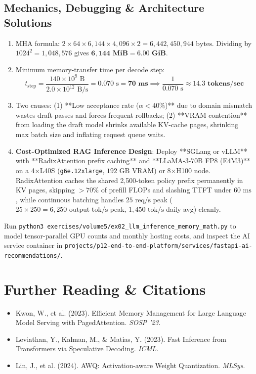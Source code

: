 \subsection*{Mechanics, Debugging \& Architecture Solutions}
\begin{enumerate}[label=\textbf{Solution~\thechapter.\arabic*}, leftmargin=*]
  \item MHA formula: $2 \times 64 \times 6,144 \times 4,096 \times 2 = 6,442,450,944\text{ bytes}$. Dividing by $1024^2 = 1,048,576$ gives $\mathbf{6,144\text{ MiB}} = \mathbf{6.00\text{ GiB}}$.
  \item Minimum memory-transfer time per decode step:
  $$t_{\text{step}} = \frac{140 \times 10^9\text{ B}}{2.0 \times 10^{12}\text{ B/s}} = 0.070\text{ s} = \mathbf{70\text{ ms}} \implies \frac{1}{0.070\text{ s}} \approx \mathbf{14.3\text{ tokens/sec}}$$
  \item Two causes: (1) **Low acceptance rate ($\alpha < 40\%$)** due to domain mismatch wastes draft passes and forces frequent rollbacks; (2) **VRAM contention** from loading the draft model shrinks available KV-cache pages, shrinking max batch size and inflating request queue waits.
  \item \textbf{Cost-Optimized RAG Inference Design}: Deploy **SGLang or vLLM** with **RadixAttention prefix caching** and **LLaMA-3-70B FP8 (E4M3)** on a 4$\times$L40S (\texttt{g6e.12xlarge}, $192\text{ GB}$ VRAM) or 8$\times$H100 node. RadixAttention caches the shared 2,500-token policy prefix permanently in KV pages, skipping $>70\%$ of prefill FLOPs and slashing TTFT under $60\text{ ms}$, while continuous batching handles $25\text{ req/s}$ peak ($25 \times 250 = 6,250\text{ output tok/s}$ peak, $1,450\text{ tok/s}$ daily avg) cleanly.
\end{enumerate}

\begin{labbridgebox}
Run \texttt{python3 exercises/volume5/ex02\_llm\_inference\_memory\_math.py} to model tensor-parallel GPU counts and monthly hosting costs, and inspect the AI service container in \texttt{projects/p12-end-to-end-platform/services/fastapi-ai-recommendations/}.
\end{labbridgebox}

\section{Further Reading \protect\& Citations}
\begin{itemize}[leftmargin=18pt]
  \item Kwon, W., et al. (2023). Efficient Memory Management for Large Language Model Serving with PagedAttention. \textit{SOSP '23}.
  \item Leviathan, Y., Kalman, M., \& Matias, Y. (2023). Fast Inference from Transformers via Speculative Decoding. \textit{ICML}.
  \item Lin, J., et al. (2024). AWQ: Activation-aware Weight Quantization. \textit{MLSys}.
\end{itemize}
